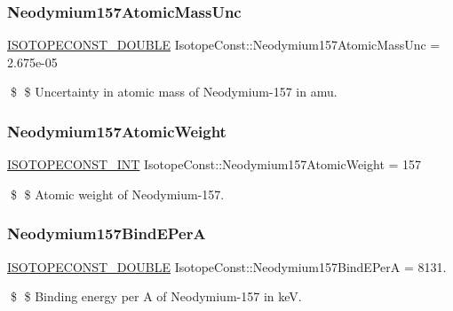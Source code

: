 \subsubsection{\texorpdfstring{Neodymium157\+Atomic\+Mass\+Unc}{Neodymium157AtomicMassUnc}}
{\footnotesize\ttfamily \mbox{\hyperlink{group___isotope_const-_macros_ga8f45a7272ce02c0b4c65c44636ed719a}{I\+S\+O\+T\+O\+P\+E\+C\+O\+N\+S\+T\+\_\+\+D\+O\+U\+B\+LE}} Isotope\+Const\+::\+Neodymium157\+Atomic\+Mass\+Unc = 2.\+675e-\/05}

\$ \$ Uncertainty in atomic mass of Neodymium-\/157 in amu. \mbox{\label{group___isotope_const-_neodymium-_nd157_ga44f75b81e65b845333c6c7d0c778d8d0}} 
\subsubsection{\texorpdfstring{Neodymium157\+Atomic\+Weight}{Neodymium157AtomicWeight}}
{\footnotesize\ttfamily \mbox{\hyperlink{group___isotope_const-_macros_ga5f18360b3e99483a35c32d789e62621c}{I\+S\+O\+T\+O\+P\+E\+C\+O\+N\+S\+T\+\_\+\+I\+NT}} Isotope\+Const\+::\+Neodymium157\+Atomic\+Weight = 157}

\$ \$ Atomic weight of Neodymium-\/157. \mbox{\label{group___isotope_const-_neodymium-_nd157_ga02f278ab08ee9615c808c1805f786b8b}} 
\subsubsection{\texorpdfstring{Neodymium157\+Bind\+E\+PerA}{Neodymium157BindEPerA}}
{\footnotesize\ttfamily \mbox{\hyperlink{group___isotope_const-_macros_ga8f45a7272ce02c0b4c65c44636ed719a}{I\+S\+O\+T\+O\+P\+E\+C\+O\+N\+S\+T\+\_\+\+D\+O\+U\+B\+LE}} Isotope\+Const\+::\+Neodymium157\+Bind\+E\+PerA = 8131.}

\$ \$ Binding energy per A of Neodymium-\/157 in keV. \mbox{\label{group___isotope_const-_neodymium-_nd157_ga24572c82a45c2cc51a35e2015b6d88e7}} 
